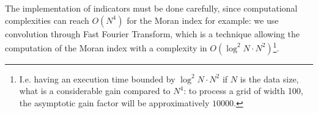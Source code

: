 
The implementation of indicators must be done carefully, since computational complexities can reach $O(N^4)$ for the Moran index for example: we use convolution through Fast Fourier Transform, which is a technique allowing the computation of the Moran index with a complexity in $O(\log^2 N \cdot N^2)$\footnote{I.e. having an execution time bounded by $\log^2 N \cdot N^2$ if $N$ is the data size, what is a considerable gain compared to $N^4$: to process a grid of width 100, the asymptotic gain factor will be approximatively $10000$.}.


